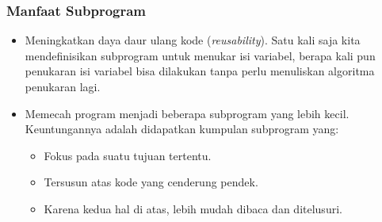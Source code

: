 \begin{frame}
\frametitle{Manfaat Subprogram}
\begin{itemize}
  \item Meningkatkan daya daur ulang kode (\textit{reusability}).
  \newline Satu kali saja kita mendefinisikan subprogram untuk menukar isi variabel, berapa kali pun penukaran isi variabel bisa dilakukan tanpa perlu menuliskan algoritma penukaran lagi.
  \item Memecah program menjadi beberapa subprogram yang lebih kecil.
  \newline Keuntungannya adalah didapatkan kumpulan subprogram yang:
  \begin{itemize}
    \item Fokus pada suatu tujuan tertentu.
    \item Tersusun atas kode yang cenderung pendek.
    \item Karena kedua hal di atas, lebih mudah dibaca dan ditelusuri.
  \end{itemize}
\end{itemize}
\end{frame}



